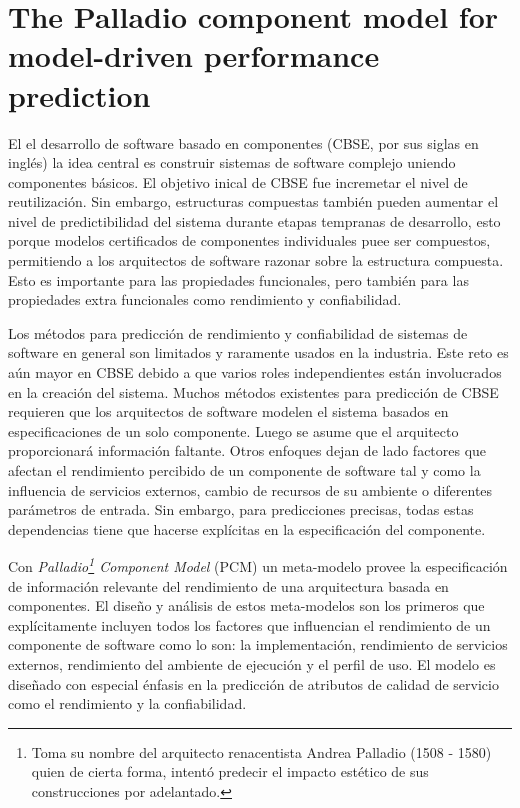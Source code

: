 \tableofcontents

\newpage
\section{The Palladio component model for model-driven performance prediction\cite{palladio-seminal}}

El el desarrollo de software basado en componentes (CBSE, por sus siglas en inglés) la idea central es construir sistemas de software complejo uniendo componentes básicos. El objetivo inical de CBSE fue incremetar el nivel de reutilización. Sin embargo, estructuras compuestas también pueden aumentar el nivel de predictibilidad del sistema durante etapas tempranas de desarrollo, esto porque modelos certificados de componentes individuales puee ser compuestos, permitiendo a los arquitectos de software razonar sobre la estructura compuesta. Esto es importante para las propiedades funcionales, pero también para las propiedades extra funcionales como rendimiento y confiabilidad. 

Los métodos para predicción de rendimiento y confiabilidad de sistemas de software en general son limitados y raramente usados en la industria. Este reto es aún mayor en CBSE debido a que varios roles independientes están involucrados en la creación del sistema. Muchos métodos existentes para predicción de CBSE requieren que los arquitectos de software modelen el sistema basados en especificaciones de un solo componente. Luego se asume que el arquitecto proporcionará información faltante. Otros enfoques dejan de lado factores que afectan el rendimiento percibido de un componente de software tal y como la influencia de servicios externos, cambio de recursos de su ambiente o diferentes parámetros de entrada. Sin embargo, para predicciones precisas, todas estas dependencias tiene que hacerse explícitas en la especificación del componente.

Con \emph{Palladio\footnote{Toma su nombre del arquitecto renacentista Andrea Palladio (1508 - 1580) quien de cierta forma, intentó predecir el impacto estético de sus construcciones por adelantado.} Component Model} (PCM) un meta-modelo provee la especificación de información relevante del rendimiento de una arquitectura basada en componentes. El diseño y análisis de estos meta-modelos son los primeros que explícitamente incluyen todos los factores que influencian el rendimiento de un componente de software como lo son: la implementación, rendimiento de servicios externos, rendimiento del ambiente de ejecución y el perfil de uso. El modelo es diseñado con especial énfasis en la predicción de atributos de calidad de servicio como el rendimiento y la confiabilidad.

